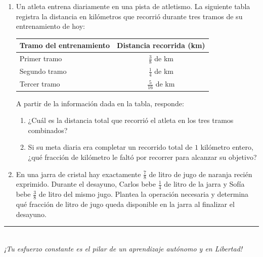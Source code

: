 \documentclass[12pt, letterpaper]{article}
\begin{document}
\begin{enumerate}[itemsep=0.8cm]
		\item Un atleta entrena diariamente en una pista de atletismo. La siguiente tabla registra la distancia en kilómetros que recorrió durante tres tramos de su entrenamiento de hoy:
		
		\begin{table}[h]
			\centering
			\begin{tabular}{lc}
				\toprule
				\textbf{Tramo del entrenamiento} & \textbf{Distancia recorrida (km)} \\
				\midrule
				Primer tramo & $\frac{3}{8}$ de km \\[0.2cm]
				Segundo tramo & $\frac{1}{4}$ de km \\[0.2cm]
				Tercer tramo & $\frac{5}{16}$ de km \\
				\bottomrule
			\end{tabular}
		\end{table}
		
		A partir de la información dada en la tabla, responde:
		\begin{enumerate}[label=\alph*., itemsep=0.2cm, topsep=0.2cm]
			\item ¿Cuál es la distancia total que recorrió el atleta en los tres tramos combinados?
			\item Si su meta diaria era completar un recorrido total de $1$ kilómetro entero, ¿qué fracción de kilómetro le faltó por recorrer para alcanzar su objetivo?
		\end{enumerate}
		
		\item En una jarra de cristal hay exactamente $\frac{7}{8}$ de litro de jugo de naranja recién exprimido. Durante el desayuno, Carlos bebe $\frac{1}{4}$ de litro de la jarra y Sofía bebe $\frac{3}{8}$ de litro del mismo jugo. Plantea la operación necesaria y determina qué fracción de litro de jugo queda disponible en la jarra al finalizar el desayuno.
		
	\end{enumerate}
	
	\vfill
	\begin{center}
		\rule{0.5\textwidth}{0.4pt} \\
		\vspace{0.2cm}
		\textit{¡Tu esfuerzo constante es el pilar de un aprendizaje autónomo y en Libertad!}
	\end{center}
	
	\newpage
	
\end{document}
